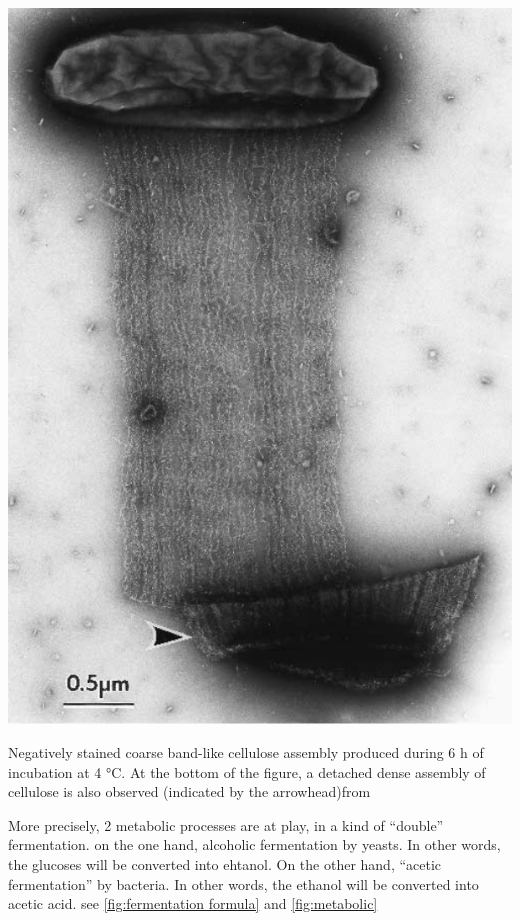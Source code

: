 \begin{marginfigure}
    \centering
    \includegraphics{images/bacteriaandcellulose.png}
    \caption{Negatively stained coarse band-like cellulose assembly produced during 6 h of incubation at 4 °C. At the bottom of the figure, a
    detached dense assembly of cellulose is also observed (indicated by the arrowhead)from\cite{hirai2002tem}}
    \label{fig:bacteriaandcellulose}
\end{marginfigure}

More precisely, 2 metabolic processes are at play, in a kind of “double” fermentation. 
on the one hand, alcoholic fermentation by yeasts. In other words, the glucoses will be converted into ehtanol. 
On the other hand, “acetic fermentation” by bacteria. In other words, the ethanol will be converted into acetic acid. see \ref{fig:fermentation formula} and \ref{fig:metabolic}

